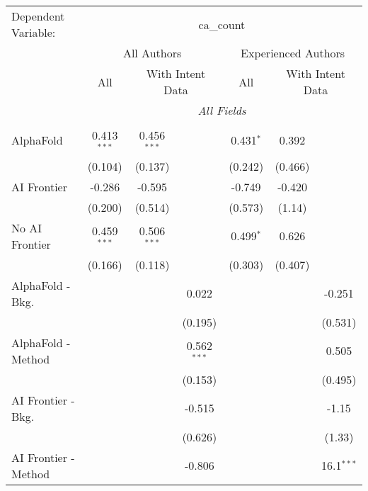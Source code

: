 \begingroup
\centering
\begin{tabular}{lcccccc}
   \tabularnewline \midrule \midrule
   Dependent Variable: & \multicolumn{6}{c}{ca\_count}\\
 & \multicolumn{3}{c}{All Authors} & \multicolumn{3}{c}{Experienced Authors} \\
\cmidrule(lr){2-4} \cmidrule(lr){5-7}
 & \multicolumn{1}{c}{All} & \multicolumn{2}{c}{With Intent Data} & \multicolumn{1}{c}{All} & \multicolumn{2}{c}{With Intent Data} \\
\cmidrule(lr){2-2} \cmidrule(lr){3-4} \cmidrule(lr){5-5} \cmidrule(lr){6-7}
 & \multicolumn{6}{c}{\textit{All Fields}} \\ \\
   AlphaFold               & 0.413$^{***}$ & 0.456$^{***}$ &               & 0.431$^{*}$ & 0.392   &   \\   
                           & (0.104)       & (0.137)       &               & (0.242)     & (0.466) &   \\   
   AI Frontier             & -0.286        & -0.595        &               & -0.749      & -0.420  &   \\   
                           & (0.200)       & (0.514)       &               & (0.573)     & (1.14)  &   \\   
   No AI Frontier          & 0.459$^{***}$ & 0.506$^{***}$ &               & 0.499$^{*}$ & 0.626   &   \\   
                           & (0.166)       & (0.118)       &               & (0.303)     & (0.407) &   \\   
   AlphaFold - Bkg.        &               &               & 0.022         &             &         & -0.251\\   
                           &               &               & (0.195)       &             &         & (0.531)\\   
   AlphaFold - Method      &               &               & 0.562$^{***}$ &             &         & 0.505\\   
                           &               &               & (0.153)       &             &         & (0.495)\\   
   AI Frontier - Bkg.      &               &               & -0.515        &             &         & -1.15\\   
                           &               &               & (0.626)       &             &         & (1.33)\\   
   AI Frontier - Method    &               &               & -0.806        &             &         & 16.1$^{***}$\\   

\end{tabular}
